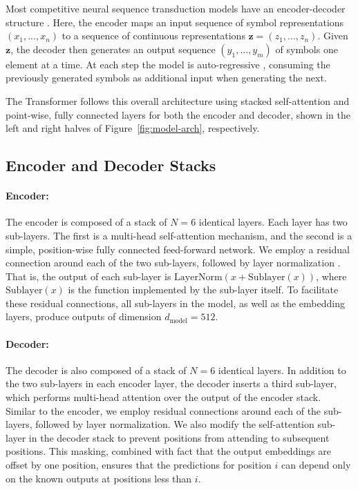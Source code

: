 \documentclass{article}
\newcommand{\dmodel}{d_{\text{model}}}
\begin{document}
Most competitive neural sequence transduction models have an encoder-decoder structure \citep{cho2014learning,bahdanau2014neural,sutskever14}. Here, the encoder maps an input sequence of symbol representations $(x_1, ..., x_n)$ to a sequence of continuous representations $\mathbf{z} = (z_1, ..., z_n)$. Given $\mathbf{z}$, the decoder then generates an output sequence $(y_1,...,y_m)$ of symbols one element at a time. At each step the model is auto-regressive \citep{graves2013generating}, consuming the previously generated symbols as additional input when generating the next.

The Transformer follows this overall architecture using stacked self-attention and point-wise, fully connected layers for both the encoder and decoder, shown in the left and right halves of Figure~\ref{fig:model-arch}, respectively.

\subsection{Encoder and Decoder Stacks}

\paragraph{Encoder:}The encoder is composed of a stack of $N=6$ identical layers. Each layer has two sub-layers. The first is a multi-head self-attention mechanism, and the second is a simple, position-wise fully connected feed-forward network.   We employ a residual connection \citep{he2016deep} around each of the two sub-layers, followed by layer normalization \cite{layernorm2016}.  That is, the output of each sub-layer is $\mathrm{LayerNorm}(x + \mathrm{Sublayer}(x))$, where $\mathrm{Sublayer}(x)$ is the function implemented by the sub-layer itself.  To facilitate these residual connections, all sub-layers in the model, as well as the embedding layers, produce outputs of dimension $\dmodel=512$.

\paragraph{Decoder:}The decoder is also composed of a stack of $N=6$ identical layers.  In addition to the two sub-layers in each encoder layer, the decoder inserts a third sub-layer, which performs multi-head attention over the output of the encoder stack.  Similar to the encoder, we employ residual connections around each of the sub-layers, followed by layer normalization.  We also modify the self-attention sub-layer in the decoder stack to prevent positions from attending to subsequent positions.  This masking, combined with fact that the output embeddings are offset by one position, ensures that the predictions for position $i$ can depend only on the known outputs at positions less than $i$.
\end{document}
